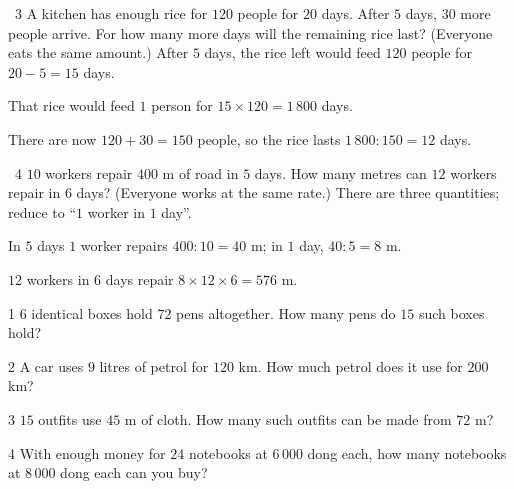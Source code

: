 \gap
\begin{exbox}{\ExWord\ 3}
A kitchen has enough rice for $120$ people for $20$ days. After $5$ days, $30$ more people arrive. For how many more days will the remaining rice last? (Everyone eats the same amount.)
\guide
After $5$ days, the rice left would feed $120$ people for $20-5=15$ days.\par
That rice would feed $1$ person for $15\times120=1\,800$ days.\par
There are now $120+30=150$ people, so the rice lasts $1\,800:150=12$ days.
\end{exbox}
\gap
\begin{exbox}{\ExWord\ 4}
$10$ workers repair $400$ m of road in $5$ days. How many metres can $12$ workers repair in $6$ days? (Everyone works at the same rate.)
\guide
There are three quantities; reduce to ``$1$ worker in $1$ day''.\par
In $5$ days $1$ worker repairs $400:10=40$ m; in $1$ day, $40:5=8$ m.\par
$12$ workers in $6$ days repair $8\times12\times6=576$ m.
\end{exbox}
\begin{probbox}{1}{\relax}
$6$ identical boxes hold $72$ pens altogether. How many pens do $15$ such boxes hold?
\end{probbox}
\gap
\begin{probbox}{2}{\relax}
A car uses $9$ litres of petrol for $120$ km. How much petrol does it use for $200$ km?
\end{probbox}
\gap
\begin{probbox}{3}{\relax}
$15$ outfits use $45$ m of cloth. How many such outfits can be made from $72$ m?
\end{probbox}
\gap
\begin{probbox}{4}{\relax}
With enough money for $24$ notebooks at $6\,000$ dong each, how many notebooks at $8\,000$ dong each can you buy?
\end{probbox}
